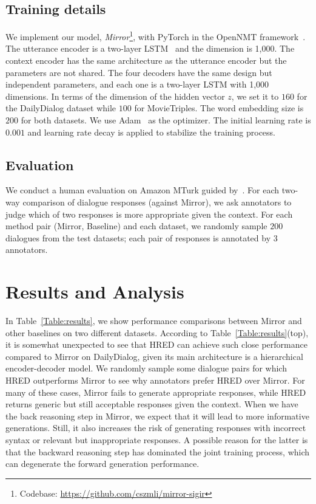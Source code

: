 \documentclass[sigconf]{acmart}
\begin{document}
\subsection{Training details}
We implement our model, \emph{Mirror}\footnote{Codebase: \url{https://github.com/cszmli/mirror-sigir}}, with PyTorch in the OpenNMT framework~\citep{opennmt}. The utterance encoder is a two-layer LSTM~\citep{hochreiter1997long} and the dimension is 1,000. The context encoder has the same architecture as the utterance encoder but the parameters are not shared. The four decoders have the same design but independent parameters, and each one is a two-layer LSTM with 1,000 dimensions. 
In terms of the dimension of the hidden vector $z$, we set it to $160$ for the DailyDialog dataset while $100$ for MovieTriples.  The word embedding size is $200$ for both datasets. We use Adam~\citep{kingma2014adam} as the optimizer. The initial learning rate is $0.001$ and learning rate decay is applied to stabilize the training process.

\subsection{Evaluation}
We conduct a human evaluation 
on Amazon MTurk guided by~\citep{li2019acute}.
For each two-way comparison of dialogue responses (against Mirror), we ask annotators to judge which of two responses is more appropriate given the context. 
For each method pair (Mirror, Baseline) and each dataset, we randomly sample $200$ dialogues from the test datasets; each pair of responses is annotated by $3$ annotators.

\section{Results and Analysis}
\label{sec:results}

In Table~\ref{Table:results}, we show performance comparisons between Mirror and other baselines on two different datasets. According to Table~\ref{Table:results}(top), it is somewhat unexpected to see that HRED can achieve such close performance compared to Mirror on DailyDialog, given its main architecture is a hierarchical encoder-decoder model. We randomly sample some dialogue pairs for which HRED outperforms Mirror to see why annotators prefer HRED over Mirror. For many of these cases, Mirror fails to generate appropriate responses, while HRED returns generic but still acceptable responses given the context. When we have the back reasoning step in Mirror, we expect that it will lead to more informative generations. Still, it also increases the risk of generating responses with incorrect syntax or relevant but inappropriate responses. A possible reason for the latter is that the backward reasoning step has dominated the joint training process, which can degenerate the forward generation performance. 
\end{document}
